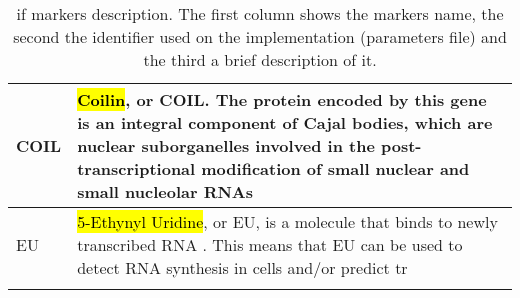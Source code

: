 \begin{longtable}{>{\centering\arraybackslash}m{\mylengtha} | m{\mylengthb}}
    COIL & \hl{Coilin}, or COIL. The protein encoded by this gene is an integral component of Cajal bodies, which are nuclear suborganelles involved in the post-transcriptional modification of small nuclear and small nucleolar RNAs \cite{COIL} \\
    \hline
    EU & \hl{5-Ethynyl Uridine}, or EU, is a molecule that binds to newly transcribed RNA \cite{jao2008exploring}. This means that EU can be used to detect RNA synthesis in cells and/or predict \gls{tr} \\
    \hline
  \caption{\Acrlong{if} markers description. The first column shows the markers name, the second the identifier used on the implementation (parameters file) and the third a brief description of it.}
  \label{table:apendix:if_markers}
\end{longtable}



